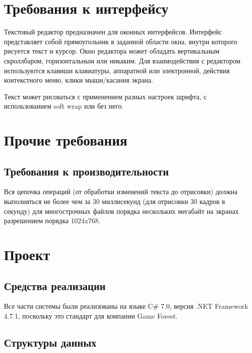 \documentclass{fefu}
\begin{document}
	\section{Требования к интерфейсу}
		\par Текстовый редактор предназначен для оконных интерфейсов. Интерфейс представляет
		собой прямоугольник в заданной области окна, внутри которого рисуется текст и курсор. Окно редактора может обладать 
		вертикальным скроллбаром, горизонтальным или никаким. Для взаимодействия с редактором
		используются клавиши клавиатуры, 
		аппаратной или электронной, действия контекстного меню, клики мыши/касания экрана.
		\par Текст может рисоваться с применением разных настроек шрифта, с использованием soft
		wrap или без него.
	\section{Прочие требования}
		\subsection{Требования к производительности}
			Вся цепочка операций (от обработки изменений текста до 
			отрисовки) должна выполняться не более чем за 30 миллисекунд (для отрисовки 30 
			кадров в секунду) для многострочных файлов порядка нескольких мегабайт на экранах
			разрешением порядка 1024x768. %
	\section{Проект}
		\subsection{Средства реализации}
			Все части системы были реализованы на языке C\# 7.0, 
			версия .NET Framework 4.7.1, поскольку это стандарт для компании Game Forest.
		\subsection{Структуры данных}
\end{document}
